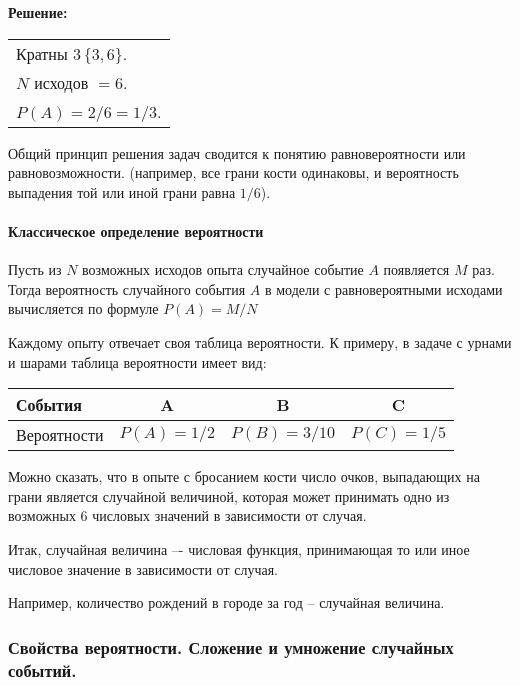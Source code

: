 \documentclass[a4paper,12pt]{report}
\newcommand*{\rtask}[1]{\rule{0pt}{10mm}\textbf{#1}}
\newcommand{\sstrut}{\rule{0pt}{10mm}}
\begin{document}
	\rtask{Решение:}\strut


	\begin{tabular}{l}

	Кратны $3\,\{3,6\}$.\\ 

	$N$ исходов $ = 6$.\\

	$P(A) = 2/6 = 1/3$.\\

	\end{tabular}


	\sstrut Общий принцип решения задач сводится к понятию равновероятности или равновозможности. (например, все грани кости одинаковы, и вероятность выпадения той или иной грани равна $1/6$).



\paragraph{Классическое определение вероятности}

	Пусть из $N$ возможных исходов опыта случайное событие $A$ появляется $M$ раз. Тогда вероятность случайного события $A$ в модели с равновероятными исходами вычисляется по формуле $P(A) = M/N$ 

	Каждому опыту отвечает своя таблица вероятности. К примеру, в задаче с урнами и шарами таблица вероятности имеет вид: \strut


	\begin{tabular}{|l|c|c|c|}
	\hline
		События & A & B & C\\
	\hline	
		Вероятности & $P(A) = 1/2$ & $P(B) = 3/10$ & $P(C) = 1/5$\\
	\hline
	\end{tabular}


	\strut Можно сказать, что в опыте с бросанием кости число очков, выпадающих на грани является случайной величиной, которая может принимать одно из возможных 6 числовых значений в зависимости от случая.

	Итак, случайная величина –- числовая функция, принимающая то или иное числовое значение в зависимости от случая.

	Например, количество рождений в городе за год -- случайная величина.






\subsubsection{Свойства вероятности. Сложение и умножение случайных событий.}
\end{document}
